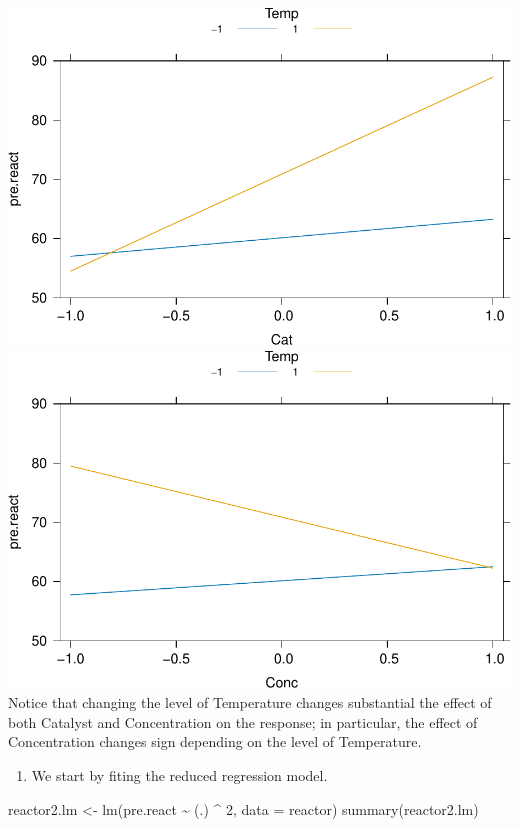 \documentclass[
]{book}
\newenvironment{Shaded}{\begin{snugshade}}{\end{snugshade}}
\newcommand{\AttributeTok}[1]{\textcolor[rgb]{0.77,0.63,0.00}{#1}}
\newcommand{\DecValTok}[1]{\textcolor[rgb]{0.00,0.00,0.81}{#1}}
\newcommand{\FunctionTok}[1]{\textcolor[rgb]{0.00,0.00,0.00}{#1}}
\newcommand{\NormalTok}[1]{#1}
\newcommand{\OtherTok}[1]{\textcolor[rgb]{0.56,0.35,0.01}{#1}}
\newcommand{\SpecialCharTok}[1]{\textcolor[rgb]{0.00,0.00,0.00}{#1}}
\providecommand{\tightlist}{%
  \setlength{\itemsep}{0pt}\setlength{\parskip}{0pt}}
\theoremstyle{definition}
\theoremstyle{definition}
\theoremstyle{definition}
\theoremstyle{definition}
\theoremstyle{remark}
\begin{document}
\includegraphics{bookdown_math3014-6027_files/figure-latex/reactor-plots-1.pdf} \includegraphics{bookdown_math3014-6027_files/figure-latex/reactor-plots-2.pdf}
Notice that changing the level of Temperature changes substantial the effect of both Catalyst and Concentration on the response; in particular, the effect of Concentration changes sign depending on the level of Temperature.

\begin{enumerate}
\def\labelenumi{\alph{enumi}.}
\setcounter{enumi}{2}
\tightlist
\item
  We start by fiting the reduced regression model.
\end{enumerate}

\begin{Shaded}
\begin{Highlighting}[]
\NormalTok{reactor2.lm }\OtherTok{\textless{}{-}} \FunctionTok{lm}\NormalTok{(pre.react }\SpecialCharTok{\textasciitilde{}}\NormalTok{ (.) }\SpecialCharTok{\^{}} \DecValTok{2}\NormalTok{, }\AttributeTok{data =}\NormalTok{ reactor)}
\FunctionTok{summary}\NormalTok{(reactor2.lm)}
\end{Highlighting}
\end{Shaded}
\end{document}
